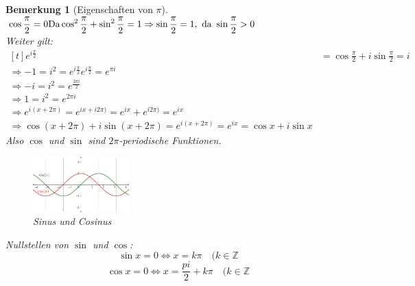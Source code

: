\documentclass[a4paper,titlepage,oneside]{article}
\def\Z{\ensuremath{\mathbb{Z}} }
\def\im{\ensuremath{\mathit{i}} }
\def\e{\ensuremath{\mathit{e}} }
\theoremstyle{thmstyle}
\newtheorem{bem}[satz]{Bemerkung}
\theoremstyle{subthmstyle}
\begin{document}
\begin{bem}[Eigenschaften von $\pi$]
$ \displaystyle 
\cos \frac{\pi}{2} = 0\\
\text{Da} \cos^2 \frac{\pi}{2}  + \sin^2 \frac{\pi}{2} = 1 \Rightarrow \sin \frac{\pi}{2} = 1, \text{ da } \sin \frac{\pi}{2}  > 0$\\
Weiter gilt: \\
$ \displaystyle \begin{aligned}[t]\e^{\im \frac{\pi}{2}} &= \cos \frac{\pi}{2} + \im \sin \frac{\pi}{2}= \im \\
\Rightarrow -1 = \im^2 = \e^{\im \frac{\pi}{2}} \e^{\im \frac{\pi}{2}}  = \e^{\pi \im} \\
\Rightarrow -\im = \im^2 = \e^{\frac{3\pi \im}{2}}  \\
\Rightarrow 1 = \im^2 = \e^{2\pi \im} \\
\Rightarrow \e^{\im (x + 2\pi)} = \e^{\im x + \im 2\pi)} = \e^{\im x} +  \e^{\im 2\pi)} = \e^{\im x} \\
\Rightarrow \cos (x + 2\pi) + \im \sin (x + 2\pi) = \e^{\im (x + 2\pi)} =  \e^{\im x}  = \cos x + \im \sin x \end{aligned}$\\
Also $\cos$ und $\sin$ sind $2\pi$-periodische Funktionen.
\begin{figure}[ht]\centering
 \includegraphics[width=0.33\textwidth]{images/sin_cos.png}
\caption{Sinus und Cosinus}
\end{figure}
Nullstellen von $\sin$ und $\cos$:
\[\sin x = 0 \Leftrightarrow x = k\pi \quad (k \in \Z\]
\[\cos x = 0 \Leftrightarrow x = \frac{pi}{2} + k\pi \quad (k \in \Z\]
\end{bem}
\end{document}
